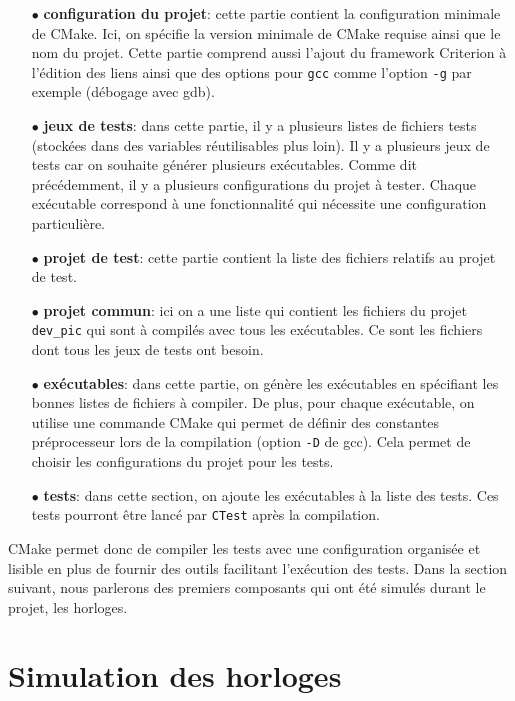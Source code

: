 \documentclass[a4paper]{article}
\begin{document}
\begin{itemize}
  \item[$\bullet$] \textbf{configuration du projet}: cette partie contient la
    configuration minimale de CMake. Ici, on spécifie la version minimale de
    CMake requise ainsi que le nom du projet. Cette partie comprend aussi
    l'ajout du framework Criterion à l'édition des liens ainsi que des options
    pour \verb|gcc| comme l'option \verb|-g| par exemple (débogage
    avec gdb).
  \item[$\bullet$] \textbf{jeux de tests}: dans cette partie, il y a plusieurs
    listes de fichiers tests (stockées dans des variables réutilisables plus
    loin). Il y a plusieurs jeux de tests car on souhaite générer plusieurs
    exécutables. Comme dit précédemment, il y a plusieurs configurations du
    projet à tester. Chaque exécutable correspond à une fonctionnalité qui
    nécessite une configuration particulière.
  \item[$\bullet$] \textbf{projet de test}: cette partie contient la liste des
    fichiers relatifs au projet de test.
  \item[$\bullet$] \textbf{projet commun}: ici on a une liste qui contient les
    fichiers du projet \verb|dev_pic| qui sont à compilés avec tous les
    exécutables. Ce sont les fichiers dont tous les jeux de tests ont besoin.
  \item[$\bullet$] \textbf{exécutables}: dans cette partie, on génère les
    exécutables en spécifiant les bonnes listes de fichiers à compiler. De plus,
    pour chaque exécutable, on utilise une commande CMake qui permet de définir
    des constantes préprocesseur lors de la compilation (option \verb|-D|
    de gcc). Cela permet de choisir les configurations du projet pour les tests.
  \item[$\bullet$] \textbf{tests}: dans cette section, on ajoute les exécutables
    à la liste des tests. Ces tests pourront être lancé par \verb|CTest|
    après la compilation.
\end{itemize}

CMake permet donc de compiler les tests avec une configuration organisée et
lisible en plus de fournir des outils facilitant l'exécution des tests. Dans la
section suivant, nous parlerons des premiers composants qui ont été simulés
durant le projet, les horloges.

\section{Simulation des horloges}%
\label{simuhorologes}
\end{document}
